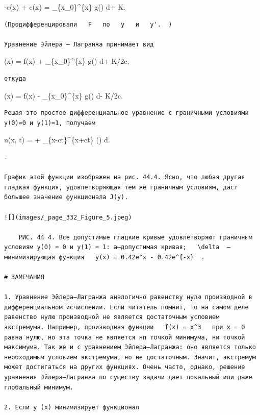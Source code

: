 \documentclass[
  ukrainian,
]{article}
\begin{document}
-c\varphi(x) + c\psi(x) = \int\_\{x\_0\}\^{}\{x\} g(\xi) d\xi + K.

\begin{verbatim}
(Продифференцировали   F   по   y   и   y'.  )

Уравнение Эйлера — Лагранжа принимает вид
\end{verbatim}

\psi(x) =  f(x) +  \int\_\{x\_0\}\^{}\{x\} g(\xi)
d\xi + K/2c,

\begin{verbatim}
откуда
\end{verbatim}

\varphi(x) =  f(x) -  \int\_\{x\_0\}\^{}\{x\}
g(\xi) d\xi - K/2c.

\begin{verbatim}
Решая это простое дифференциальное уравнение с граничными условиями y(0)=0 и y(1)=1, получаем
\end{verbatim}

u(x, t) =  \left[ f(x-ct) + f(x+ct) \right] + 
\int\_\{x-ct\}\^{}\{x+ct\} (\xi) d\xi.

\begin{verbatim}
.

График этой функции изображен на рис. 44.4. Ясно, что любая другая гладкая функция, удовлетворяющая тем же граничным условиям, даст большее значение функционала J(y).

![](images/_page_332_Figure_5.jpeg)

    РИС. 44 4. Все допустимые гладкие кривые удовлетворяют граничным условиям y(0) = 0 и y(1) = 1: a—допустимая кривая;   \delta  —минимизирующая функция   y(x) = 0.42e^x - 0.42e^{-x}  .

# ЗАМЕЧАНИЯ

1. Уравнение Эйлера—Лагранжа аналогично равенству нулю производной в дифференциальном исчислении. Если читатель помнит, то на самом деле равенство нулю производной не является достаточным условием экстремума. Например, производная функции   f(x) = x^3   при x = 0 равна нулю, но эта точка не является нп точкой минимума, ни точкой максимума. Так же и с уравнением Эйлера—Лагранжа: оно является только необходимым условием экстремума, но не достаточным. Значит, экстремум может достигаться на других функциях. Очень часто, однако, решение уравнения Эйлера—Лагранжа по существу задачи дает локальный или даже глобальный минимум.

2. Если у (х) минимизирует функционал
\end{verbatim}
\end{document}
